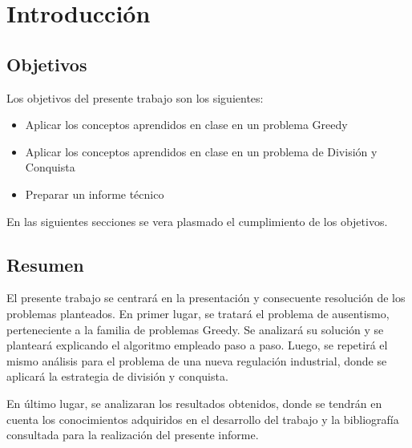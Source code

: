 \section{Introducción}

\subsection{Objetivos}
Los objetivos del presente trabajo son los siguientes:
\begin{itemize}
\item Aplicar los conceptos aprendidos en clase en un problema Greedy
\item Aplicar los conceptos aprendidos en clase en un problema de División y Conquista
\item Preparar un informe técnico
\end{itemize}

En las siguientes secciones se vera plasmado el cumplimiento de los objetivos.\newline

\subsection{Resumen}
El presente trabajo se centrará en la presentación y consecuente resolución de los problemas planteados.\newline 
En primer lugar, se tratará el problema de ausentismo, perteneciente a la familia de problemas Greedy. Se analizará su solución y se planteará explicando el algoritmo empleado paso a paso.
Luego, se repetirá el mismo análisis para el problema de una nueva regulación industrial, donde se aplicará la estrategia de división y conquista.

En último lugar, se analizaran los resultados obtenidos, donde se tendrán en cuenta los conocimientos adquiridos en el desarrollo del trabajo y la bibliografía consultada para la realización del presente informe.
